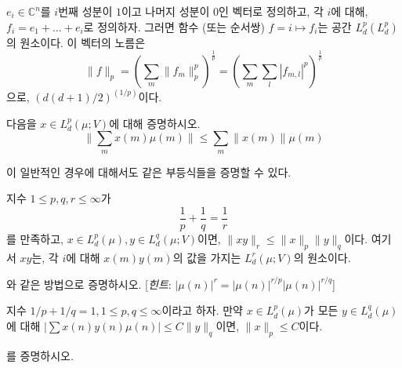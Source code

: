 \begin{example}
    $e_i \in \mathbb{C}^n$를 $i$번째 성분이 $1$이고 나머지 성분이 $0$인 벡터로 정의하고, 각 $i$에 대해, $f_i = e_1 + \dots + e_i$로 정의하자.
    그러면 함수 (또는 순서쌍) $f = i \mapsto f_i$는 공간 $L^p_d(L^p_d)$의 원소이다.
    이 벡터의 노름은
    \begin{equation*}
        \|f\|_p = \left( \sum_m \|f_m\|^p_p \right)^{\frac{1}{p}} = \left( \sum_m \sum_l |f_{m, l}|^p \right)^{\frac{1}{p}}
    \end{equation*}
    으로, $(d(d + 1)/2)^{(1/p)}$이다.
\end{example}

\begin{exercise}
    다음을 $x \in L^p_d(\mu;V)$에 대해 증명하시오.
    \begin{equation*}
        \| \sum_m x(m) \mu(m) \| \leq \sum_m \|x(m)\| \mu(m)
    \end{equation*}
\end{exercise}

이 일반적인 경우에 대해서도 같은 부등식들을 증명할 수 있다.

\begin{theorem}
\label{thm:lpholder}  
    지수 $1 \leq p, q, r \leq \infty$가
    \begin{equation*}
        \frac{1}{p} + \frac{1}{q} = \frac{1}{r}
    \end{equation*}
    를 만족하고, $x \in L^p_d(\mu), y \in L^q_d(\mu; V)$이면, $\|xy\|_r \leq \|x\|_p\|y\|_q$이다.
    여기서 $xy$는, 각 $i$에 대해 $x(m)y(m)$의 값을 가지는 $L^r_d(\mu; V)$의 원소이다.
\end{theorem}
\begin{exercise}
\label{exer:lpgenholder}
    와 같은 방법으로 증명하시오. [\textit{힌트}: $|\mu(n)|^r = |\mu(n)|^{r/p}  |\mu(n)|^{r/q}$]
\end{exercise}

\begin{theorem}
\label{thm:holderconvlp}
    지수 $1/p + 1/q = 1, 1 \leq p,q \leq \infty$이라고 하자.
    만약 $x \in L^p_d(\mu)$가 모든 $y \in L^q_d(\mu)$에 대해 $|\sum x(n) y(n) \mu(n)| \leq C \|y\|_q$이면, $\|x\|_p \leq C$이다.
\end{theorem}

\begin{exercise}
    를 증명하시오.
\end{exercise}

